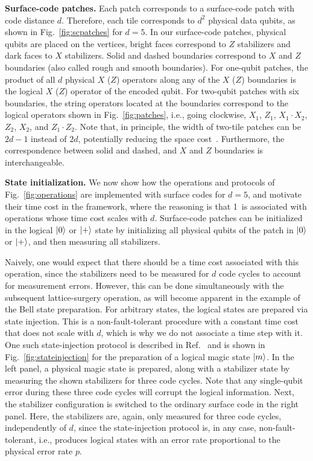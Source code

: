 \documentclass[prx,aps,letterpaper,twocolumn,allowfontchageintitle=true,accepted=2019-02-01]{quantumarticle}
\begin{document}
\textbf{Surface-code patches.} Each patch corresponds to a surface-code patch with code distance $d$. Therefore, each tile corresponds to $d^2$ physical data qubits, as shown in Fig.~\ref{fig:scpatches} for $d=5$. In our surface-code patches, physical qubits are placed on the vertices, bright faces correspond to $Z$ stabilizers and dark faces to $X$ stabilizers. Solid and dashed boundaries correspond to $X$ and $Z$ boundaries (also called rough and smooth boundaries). For one-qubit patches, the product of all $d$ physical $X$ ($Z$) operators along any of the $X$ ($Z$) boundaries is the logical $X$ ($Z$) operator of the encoded qubit. For two-qubit patches with six boundaries, the string operators  located at the boundaries correspond to the logical operators shown in Fig.~\ref{fig:patches}, i.e., going clockwise, $X_1$, $Z_1$, $X_1 \cdot X_2$, $Z_2$, $X_2$, and $Z_1 \cdot Z_2$. Note that, in principle, the width of two-tile patches can be $2d-1$ instead of $2d$, potentially reducing the space cost~\cite{Litinski2017b}. Furthermore, the correspondence between solid and dashed, and $X$ and $Z$ boundaries is interchangeable.



\textbf{State initialization.} We now show how the operations and protocols of Fig.~\ref{fig:operations} are implemented with surface codes for $d=5$, and motivate their time cost in the framework, where the reasoning is that 1\clock \ is associated with operations whose time cost scales with $d$. Surface-code patches can be initialized in the logical $\ket{0}$ or $\ket{+}$ state by initializing all physical qubits of the patch in $\ket{0}$ or $\ket{+}$, and then measuring all stabilizers.

Naively, one would expect that there should be a time cost associated with this operation, since the stabilizers need to be measured for $d$ code cycles to account for measurement errors. However, this can be done simultaneously with the subsequent lattice-surgery operation, as will become apparent in the example of the Bell state preparation. For arbitrary states, the logical states are prepared via state injection. This is a non-fault-tolerant procedure with a constant time cost that does not scale with $d$, which is why we do not associate a time step with it. One such state-injection protocol is described in Ref.~\cite{Landahl2014} and is shown in Fig.~\ref{fig:stateinjection} for the preparation of a logical magic state $\ket{m}$. In the left panel, a physical magic state is prepared, along with a stabilizer state by measuring the shown stabilizers for three code cycles. Note that any single-qubit error during these three code cycles will corrupt the logical information. Next, the stabilizer configuration is switched to the ordinary surface code in the right panel. Here, the stabilizers are, again, only measured for three code cycles, independently of $d$, since the state-injection protocol is, in any case, non-fault-tolerant, i.e., produces logical states with an error rate proportional to the physical error rate $p$.
\end{document}
